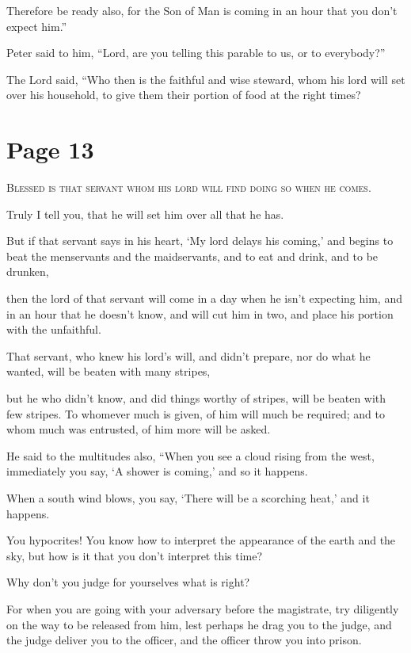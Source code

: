 Therefore be ready also, for the Son of Man is coming in an hour that you don’t expect him.”

Peter said to him, “Lord, are you telling this parable to us, or to everybody?”

The Lord said, “Who then is the faithful and wise steward, whom his lord will set over his household, to give them their portion of food at the right times?



\chapterornament
\section*{Page 13}

\lettrine{B}{lessed is that servant whom his lord will find doing so when he comes.}

Truly I tell you, that he will set him over all that he has.

But if that servant says in his heart, ‘My lord delays his coming,’ and begins to beat the menservants and the maidservants, and to eat and drink, and to be drunken,

then the lord of that servant will come in a day when he isn’t expecting him, and in an hour that he doesn’t know, and will cut him in two, and place his portion with the unfaithful.

That servant, who knew his lord’s will, and didn’t prepare, nor do what he wanted, will be beaten with many stripes,

but he who didn’t know, and did things worthy of stripes, will be beaten with few stripes. To whomever much is given, of him will much be required; and to whom much was entrusted, of him more will be asked.

He said to the multitudes also, “When you see a cloud rising from the west, immediately you say, ‘A shower is coming,’ and so it happens.

When a south wind blows, you say, ‘There will be a scorching heat,’ and it happens.

You hypocrites! You know how to interpret the appearance of the earth and the sky, but how is it that you don’t interpret this time?

Why don’t you judge for yourselves what is right?

For when you are going with your adversary before the magistrate, try diligently on the way to be released from him, lest perhaps he drag you to the judge, and the judge deliver you to the officer, and the officer throw you into prison.

